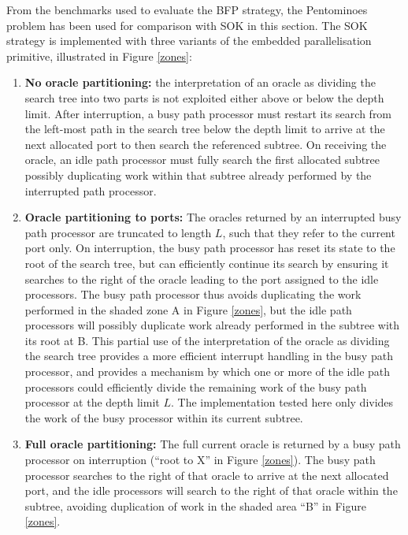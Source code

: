 From the benchmarks used to evaluate the BFP strategy, the Pentominoes problem has
been used for comparison with SOK in this section.  The SOK strategy is implemented
with three variants of the embedded parallelisation primitive,
illustrated in Figure \ref{zones}:
\begin{enumerate}
\item{\textbf{No oracle partitioning:} the interpretation of an oracle as dividing
  the search tree into two parts is not exploited either above or below the depth
  limit.  After interruption, a busy path processor must restart its search from
  the left-most path in the search tree below the depth limit to arrive at the
  next allocated port to then search the referenced subtree.  On receiving the
  oracle, an idle path processor must fully search the first allocated subtree
  possibly duplicating work within that subtree
  already performed by the interrupted path processor.}
\item{\textbf{Oracle partitioning to ports:} The oracles returned by an interrupted
  busy path processor are truncated to length $L$, such that they refer to the
  current port only.  On interruption, the busy path processor has reset its state
  to the root of the search tree, but can efficiently continue its search by
  ensuring it searches to the right of the oracle leading to the port assigned to
  the idle processors.  The busy path processor thus avoids duplicating the work
  performed in the shaded zone A in Figure \ref{zones}, but the idle path processors
  will possibly duplicate work already performed in the subtree
  with its root at B.  This partial use
  of the interpretation of the oracle as dividing the search tree provides a more
  efficient interrupt handling in the busy path processor, and provides a mechanism
  by which one or more of the idle path processors could efficiently divide the
  remaining work of the busy path processor at the depth limit $L$.  The implementation
  tested here only divides the work of the busy processor within its current
  subtree.}
\enlargethispage{\baselineskip} %
\item{\textbf{Full oracle partitioning:} The full current oracle is returned by a busy
  path processor on interruption (``root to X'' in Figure \ref{zones}).  The busy
  path processor searches to the right of that oracle to arrive at the next allocated
  port, and the idle processors will search to the right of that oracle within the
  subtree, avoiding duplication of work in the shaded area ``B'' in 
  Figure \ref{zones}.}
\end{enumerate}

